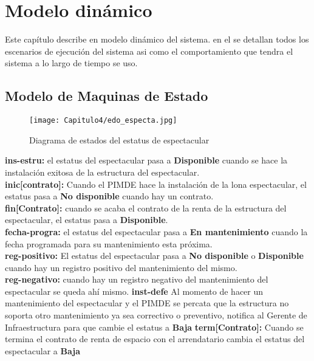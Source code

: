 \chapter{Modelo dinámico}
\label{cap:ModeloDinamico}

Este capítulo describe en modelo dinámico del sistema. en el se detallan todos los escenarios de ejecución del sistema asi como el comportamiento que tendra el sistema a lo largo de tiempo se uso.

\clearpage
\section{Modelo de Maquinas de Estado}
\begin{figure}[htbp!]
    \centering
    \texttt{[image: Capitulo4/edo\_especta.jpg]}
    \caption{Diagrama de estados del estatus de espectacular}
    \label{fig:my_label}
\end{figure}
\textbf{ins-estru:} el estatus del espectacular pasa a \textbf{Disponible} cuando se hace la instalación exitosa de la estructura del espectacular.
\\
\textbf{inic[contrato]:} Cuando el PIMDE hace la instalación de la lona espectacular, el estatus pasa a \textbf{No disponible} cuando hay un contrato. 
\\
\textbf{fin[Contrato]:} cuando se acaba el contrato de la renta de la estructura del espectacular, el estatus pasa a \textbf{Disponible}.
\\
\textbf{fecha-progra:} el estatus del espectacular pasa a \textbf{En mantenimiento} cuando la fecha programada para su mantenimiento esta próxima.
\\
\textbf{reg-positivo:} El estatus del espectacular pasa a \textbf{No disponible} o \textbf{Disponible} cuando hay un registro positivo del mantenimiento del mismo.
\\
\textbf{reg-negativo:} cuando hay un registro negativo del mantenimiento del espectacular se queda ahí mismo.
\textbf{inst-defe} Al momento de hacer un mantenimiento del espectacular y el PIMDE se percata que la estructura no soporta otro mantenimiento ya sea correctivo o preventivo, notifica al Gerente de Infraestructura para que cambie el estatus a \textbf{Baja}
\textbf{term[Contrato]:} Cuando se termina el contrato de renta de espacio con el arrendatario cambia el estatus del espectacular a \textbf{Baja}
\clearpage

